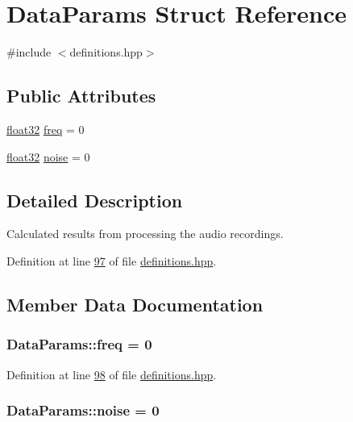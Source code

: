 \hypertarget{structDataParams}{\section{Data\+Params Struct Reference}
\label{structDataParams}
}


{\ttfamily \#include $<$definitions.\+hpp$>$}

\subsection*{Public Attributes}
\begin{DoxyCompactItemize}
\item 
\hyperlink{definitions_8hpp_aacdc525d6f7bddb3ae95d5c311bd06a1}{float32} \hyperlink{structDataParams_a12566e017407647bc8287d62554ad3fb}{freq} = 0
\item 
\hyperlink{definitions_8hpp_aacdc525d6f7bddb3ae95d5c311bd06a1}{float32} \hyperlink{structDataParams_a4efd1d2231c6fa7c878c9d5e1650738f}{noise} = 0
\end{DoxyCompactItemize}


\subsection{Detailed Description}
Calculated results from processing the audio recordings. 

Definition at line \hyperlink{definitions_8hpp_source_l00097}{97} of file \hyperlink{definitions_8hpp_source}{definitions.\+hpp}.



\subsection{Member Data Documentation}
\hypertarget{structDataParams_a12566e017407647bc8287d62554ad3fb}{
\subsubsection[{freq}]{ Data\+Params\+::freq = 0}}\label{structDataParams_a12566e017407647bc8287d62554ad3fb}


Definition at line \hyperlink{definitions_8hpp_source_l00098}{98} of file \hyperlink{definitions_8hpp_source}{definitions.\+hpp}.

\hypertarget{structDataParams_a4efd1d2231c6fa7c878c9d5e1650738f}{
\subsubsection[{noise}]{ Data\+Params\+::noise = 0}}\label{structDataParams_a4efd1d2231c6fa7c878c9d5e1650738f}


